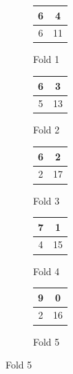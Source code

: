 \documentclass[12pt, a4paper]{report}
\begin{document}
\begin{figure}[H]
\centering

\begin{subfigure}[b]{0.18\textwidth}
\centering
\begin{tabular}{|c|c|}
\hline
6 & 4 \\
\hline
6 & 11 \\
\hline
\end{tabular}
\caption*{Fold 1}
\end{subfigure}
\begin{subfigure}[b]{0.18\textwidth}
\centering
\begin{tabular}{|c|c|}
\hline
6 & 3 \\
\hline
5 & 13 \\
\hline
\end{tabular}
\caption*{Fold 2}
\end{subfigure}
\begin{subfigure}[b]{0.18\textwidth}
\centering
\begin{tabular}{|c|c|}
\hline
6 & 2 \\
\hline
2 & 17 \\
\hline
\end{tabular}
\caption*{Fold 3}
\end{subfigure}
\begin{subfigure}[b]{0.18\textwidth}
\centering
\begin{tabular}{|c|c|}
\hline
7 & 1 \\
\hline
4 & 15 \\
\hline
\end{tabular}
\caption*{Fold 4}
\end{subfigure}
\begin{subfigure}[b]{0.18\textwidth}
\centering
\begin{tabular}{|c|c|}
\hline
9 & 0 \\
\hline
2 & 16 \\
\hline
\end{tabular}
\caption*{Fold 5}
\end{subfigure}

\vspace{1em}


\end{figure}
\end{document}
